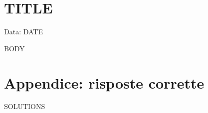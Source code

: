 \documentclass[12pt]{article}
\begin{document}
\section*{{{TITLE}}}
\hfill Data: {{DATE}}

{{BODY}}

\newpage
\section*{Appendice: risposte corrette}
{{SOLUTIONS}}
\end{document}
